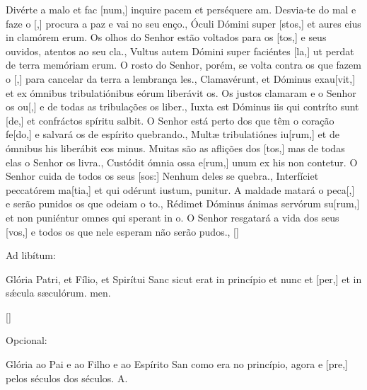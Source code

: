 {  {Divérte a malo et fac [num,] inquire pacem et perséquere am.}%
    {Desvia-te do mal e faze o [,] procura a paz e vai no seu enço.},
  {Óculi Dómini super [stos,] et aures eius in clamórem erum.}%
    {Os olhos do Senhor estão voltados para os [tos,] e seus ouvidos, atentos ao seu cla.},
  {Vultus autem Dómini super faciéntes [la,] ut perdat de ter\-ra memóriam erum.}%
    {O rosto do Senhor, porém, se volta contra os que fazem o [,] para cancelar da terra a lembrança les.},
  {Clamavérunt, et Dóminus exau[vit,] et ex ómnibus tribulatiónibus eórum liberávit os.}%
    {Os justos clamaram e o Senhor os ou[,] e de todas as tribulações os liber.},
  {Iuxta est Dóminus iis qui contríto sunt [de,] et confráctos spíritu salbit.}%
    {O Senhor está perto dos que têm o coração fe[do,] e salvará os de espírito quebrando.},
  {Multæ tribulatiónes iu[rum,] et de ómnibus his liberábit eos minus.}%
    {Muitas são as aflições dos [tos,] mas de todas elas o Senhor os livra.},
  {Custódit ómnia ossa e[rum,] unum ex his non contetur.}%
    {O Senhor cuida de todos os seus [sos:] Nenhum deles se quebra.},
  {Interfíciet peccatórem ma[tia,] et qui odérunt iustum, puni\-tur.}%
    {A maldade matará o peca[,] e serão punidos os que odeiam o to.},
  {Rédimet Dóminus ánimas servórum su[rum,] et non puniéntur omnes qui sperant in o.}%
    {O Senhor resgatará a vida dos seus [vos,] e todos os que nele esperam não serão pudos.},
  []{\begin{rubrica}Ad libítum:\end{rubrica} Glória Patri, et Fílio, et Spirítui Sanc sicut erat in princípio et nunc et [per,] et in sǽcula sæculórum. men.}%
    []{\begin{rubrica}Opcional:\end{rubrica} Glória ao Pai e ao Filho e ao Espírito San como era no princípio, agora e [pre,] pelos séculos dos séculos. A.}
}